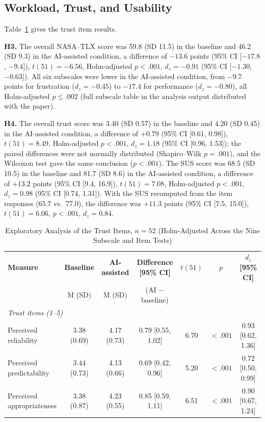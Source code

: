 \documentclass[journal]{IEEEtran}
\theoremstyle{plain}
\theoremstyle{definition}
\begin{document}
    \subsection{Workload, Trust, and Usability}
    \label{sec:res_sub}
    Table~\ref{tab:subscales} gives the trust item results.

    \textbf{H3.} The overall NASA--TLX score was 59.8 (SD 11.5) in the baseline and 46.2 (SD 9.3) in the AI-assisted condition, a difference of $-13.6$ points (95\% CI [$-17.8$, $-9.4$]), $t(51)=-6.56$, Holm-adjusted $p<.001$, $d_z=-0.91$ (95\% CI [$-1.30$, $-0.63$]). All six subscales were lower in the AI-assisted condition, from $-9.7$ points for frustration ($d_z=-0.45$) to $-17.4$ for performance ($d_z=-0.80$), all Holm-adjusted $p \leq .002$ (full subscale table in the analysis output distributed with the paper).

    \textbf{H4.} The overall trust score was 3.40 (SD 0.57) in the baseline and 4.20 (SD 0.45) in the AI-assisted condition, a difference of $+0.79$ (95\% CI [0.61, 0.98]), $t(51)=8.49$, Holm-adjusted $p<.001$, $d_z=1.18$ (95\% CI [0.96, 1.53]); the paired differences were not normally distributed (Shapiro--Wilk $p=.001$), and the Wilcoxon test gave the same conclusion ($p<.001$). The SUS score was 68.5 (SD 10.5) in the baseline and 81.7 (SD 8.6) in the AI-assisted condition, a difference of $+13.2$ points (95\% CI [9.4, 16.9]), $t(51)=7.08$, Holm-adjusted $p<.001$, $d_z=0.98$ (95\% CI [0.74, 1.31]). With the SUS recomputed from the item responses (65.7 vs.\ 77.0), the difference was $+11.3$ points (95\% CI [7.5, 15.0]), $t(51)=6.06$, $p<.001$, $d_z=0.84$.

    \begin{table}[t]
        \caption{Exploratory Analysis of the Trust Items, $n=52$ (Holm-Adjusted Across the Nine Subscale and Item Tests)}
        \label{tab:subscales}
        \centering
        \begin{tabular}{l c c c c c c}
            \toprule
            \textbf{Measure} & \textbf{Baseline} & \textbf{AI-assisted} & \textbf{Difference [95\% CI]} & \textbf{$t(51)$} & \textbf{$p$} & \textbf{$d_z$ [95\% CI]} \\
            & M (SD) & M (SD) & (AI $-$ baseline) & & & \\
            \midrule
            \multicolumn{7}{l}{\emph{Trust items (1--5)}} \\
            Perceived reliability & 3.38 (0.69) & 4.17 (0.73) & 0.79 [0.55, 1.02] & 6.70 & $<.001$ & 0.93 [0.62, 1.36] \\
            Perceived predictability & 3.44 (0.73) & 4.13 (0.66) & 0.69 [0.42, 0.96] & 5.20 & $<.001$ & 0.72 [0.50, 0.99] \\
            Perceived appropriateness & 3.38 (0.87) & 4.23 (0.55) & 0.85 [0.59, 1.11] & 6.51 & $<.001$ & 0.90 [0.67, 1.24] \\
            \bottomrule
        \end{tabular}
    \end{table}
\end{document}
